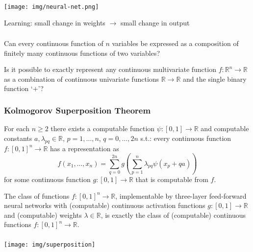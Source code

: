 \documentclass[UTF8,11pt,colorlinks,compress,openany]{beamer}%
\begin{document}
\begin{frame}\frametitle{}
	\centering \texttt{[image: img/neural-net.png]}
	
	{\centering Learning: small change in weights $\to$ small change in output}
\end{frame}

\begin{frame}\frametitle{}
\begin{problem}
Can every continuous function of $n$ variables be expressed as a composition of finitely many continuous functions of two variables?	
\end{problem}
\begin{problem}
Is it possible to exactly represent any continuous multivariate function $f:\mathbb{R}^n\to\mathbb{R}$ as a combination of continuous univariate functions $\mathbb{R}\to\mathbb{R}$ and the single binary function `$+$'?
\end{problem}
\end{frame}

\begin{frame}\frametitle{Kolmogorov Superposition Theorem}
	\begin{theorem}
		For each $n\geq 2$ there exists a computable function $\psi: [0, 1]\to\mathbb{R}$ and computable constants $a,\lambda_{pq}\in\mathbb{R}$, $p=1,\dots,n$, $q=0,\dots,2n$ s.t.: every continuous function $f: [0,1]^n\to\mathbb{R}$ has a representation as
		\[f(x_1,\dots,x_n)=\sum\limits_{q=0}^{2n} g\left(\sum\limits_{p=1}^n\lambda_{pq}\psi(x_p+qa)\right)\]
		for some continuous function $g:[0,1]\to\mathbb{R}$ that is computable from $f$.
	\end{theorem}
	\begin{theorem}
		The class of functions $f: [0, 1]^n\to\mathbb{R}$, implementable by three-layer feed-forward neural networks with (computable) continuous activation functions $g: [0, 1]\to\mathbb{R}$ and (computable) weights $\lambda\in\mathbb{R}$, is exactly the class of (computable) continuous functions $f:[0,1]^n\to\mathbb{R}$.
	\end{theorem}
\end{frame}

\begin{frame}\frametitle{}
	\centering \texttt{[image: img/superposition]}
\end{frame}
\end{document}
